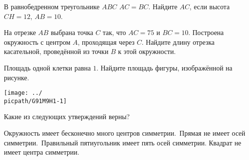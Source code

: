 \begin{homework}[number=1]
\begin{listofex}
		\item В равнобедренном треугольнике \( ABC \) \( AC=BC \). Найдите \( AC \), если высота \( CH=12 \), \( AB=10 \).
		\item На отрезке \( AB \) выбрана точка \( C \) так, что \( AC=75 \) и \( BC=10 \). Построена окружность с центром \( A \), проходящая через \( C \). Найдите длину отрезка касательной, проведённой из точки \( B \) к этой окружности.
		\item
		\begin{minipage}[t]{\bodywidth}
			Площадь одной клетки равна \( 1 \). Найдите площадь фигуры, изображённой на рисунке.
			\foranswer
		\end{minipage}
		\gapwidth
		\begin{minipage}[t]{\picwidth}
			\texttt{[image: ../\\picpath/G91M9H1-1]}
		\end{minipage}
		\item Какие из следующих утверждений верны?
		\begin{tasks}
			\task Окружность имеет бесконечно много центров симметрии.
			\task Прямая не имеет осей симметрии.
			\task Правильный пятиугольник имеет пять осей симметрии.
			\task Квадрат не имеет центра симметрии.
		\end{tasks}
	\end{listofex}
\end{homework}

